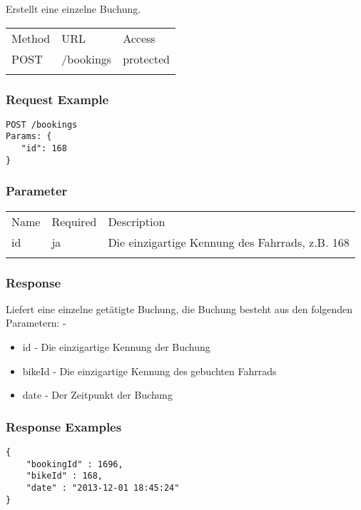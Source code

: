 Erstellt eine einzelne Buchung.

\begin{longtable}[c]{@{}lll@{}}
\toprule\addlinespace
Method & URL & Access
\\\addlinespace
\midrule\endhead
POST & /bookings & protected
\\\addlinespace
\bottomrule
\end{longtable}

\subsubsection{Request Example}\label{request-example}

\begin{verbatim}
POST /bookings
Params: {
   "id": 168
}
\end{verbatim}

\subsubsection{Parameter}\label{parameter}

\begin{longtable}[c]{@{}lll@{}}
\toprule\addlinespace
Name & Required & Description
\\\addlinespace
\midrule\endhead
id & ja & Die einzigartige Kennung des Fahrrads, z.B. 168
\\\addlinespace
\bottomrule
\end{longtable}

\subsubsection{Response}\label{response}

Liefert eine einzelne getätigte Buchung, die Buchung besteht aus den
folgenden Parametern: - 
\begin{itemize}
\item id - Die einzigartige Kennung der Buchung
\item bikeId - Die einzigartige Kennung des gebuchten Fahrrads
\item date - Der Zeitpunkt der Buchung
\end{itemize}

\subsubsection{Response Examples}\label{response-examples}

\begin{verbatim}
{
   	"bookingId" : 1696,
   	"bikeId" : 168,
   	"date" : "2013-12-01 18:45:24"
}
\end{verbatim}
